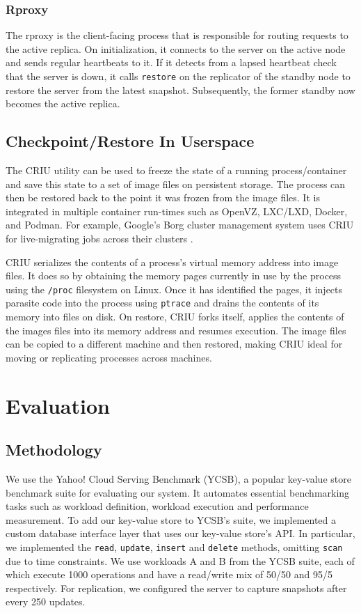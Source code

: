 \documentclass[final]{proc}
\begin{document}
\subsubsection{Rproxy}

The rproxy is the client-facing process that is responsible for routing requests
to the active replica. On initialization, it connects to the server on the
active node and sends regular heartbeats to it. If it detects from a lapsed
heartbeat check that the server is down, it calls \verb|restore| on the
replicator of the standby node to restore the server from the latest
snapshot. Subsequently, the former standby now becomes the active replica.

\subsection{Checkpoint/Restore In Userspace}\label{CRIU}

The CRIU utility can be used to freeze the state of a running process/container
and save this state to a set of image files on persistent storage. The process
can then be restored back to the point it was frozen from the image files. It is
integrated in multiple container run-times such as OpenVZ, LXC/LXD, Docker, and
Podman. For example, Google's Borg cluster management system uses CRIU for
live-migrating jobs across their clusters \cite{marmol2018task}.

CRIU serializes the contents of a process's virtual memory address into image
files. It does so by obtaining the memory pages currently in use by the process
using the \verb|/proc| filesystem on Linux. Once it has identified the pages, it
injects parasite code into the process using \verb|ptrace| and drains the
contents of its memory into files on disk. On restore, CRIU forks itself,
applies the contents of the images files into its memory address and resumes
execution. The image files can be copied to a different machine and then
restored, making CRIU ideal for moving or replicating processes across machines.

\section{Evaluation}

\subsection{Methodology}

We use the Yahoo! Cloud Serving Benchmark (YCSB), a popular key-value store
benchmark suite for evaluating our system. It automates essential benchmarking
tasks such as workload definition, workload execution and performance
measurement. To add our key-value store to YCSB's suite, we implemented a custom
database interface layer that uses our key-value store's API. In particular, we
implemented the \verb|read|, \verb|update|, \verb|insert| and \verb|delete|
methods, omitting \verb|scan| due to time constraints. We use workloads A and B
from the YCSB suite, each of which execute 1000 operations and have a read/write
mix of 50/50 and 95/5 respectively. For replication, we configured the server to
capture snapshots after every 250 updates.
\end{document}
